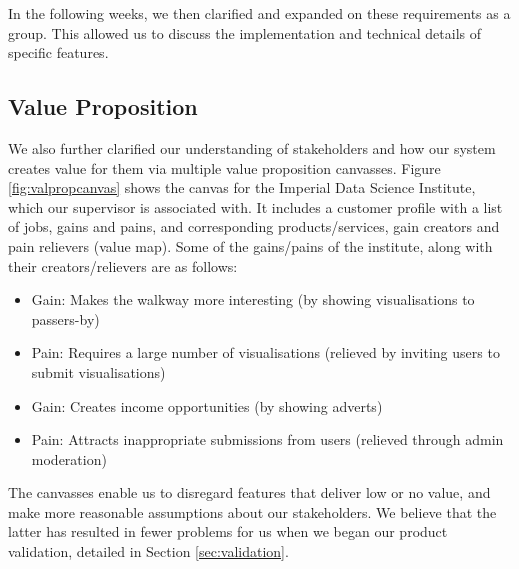 \documentclass[a4paper]{article}
\begin{document}
In the following weeks, we then clarified and expanded on these requirements as a group. This allowed us to discuss the implementation and technical details of specific features.

\subsection{Value Proposition}

We also further clarified our understanding of stakeholders and how our system creates value for them via multiple value proposition canvasses. Figure \ref{fig:valpropcanvas} shows the canvas for the Imperial Data Science Institute, which our supervisor is associated with. It includes a customer profile with a list of jobs, gains and pains, and corresponding products/services, gain creators and pain relievers (value map). Some of the gains/pains of the institute, along with their creators/relievers are as follows:

\begin{itemize}

  \item Gain: Makes the walkway more interesting (by showing visualisations to passers-by)

  \item Pain: Requires a large number of visualisations (relieved by inviting users to submit visualisations)

  \item Gain: Creates income opportunities (by showing adverts)

  \item Pain: Attracts inappropriate submissions from users (relieved through admin moderation)

\end{itemize}

The canvasses enable us to disregard features that deliver low or no value, and make more reasonable assumptions about our stakeholders. We believe that the latter has resulted in fewer problems for us when we began our product validation, detailed in Section \ref{sec:validation}.
\end{document}
